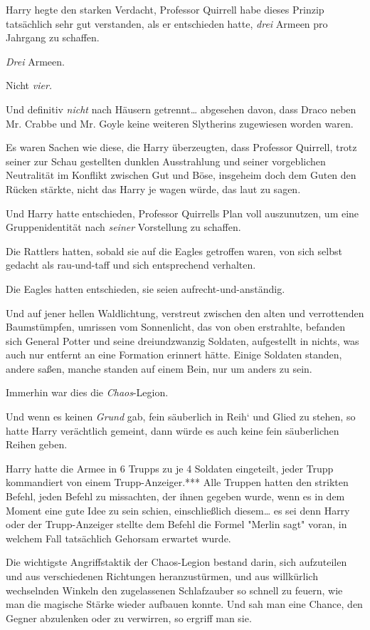 {Harry hegte den starken Verdacht, Professor Quirrell habe dieses Prinzip tatsächlich sehr gut verstanden, als er entschieden hatte, \emph{drei} Armeen pro Jahrgang zu schaffen.

\emph{Drei} Armeen.

Nicht \emph{vier.}

Und definitiv \emph{nicht} nach Häusern getrennt… abgesehen davon, dass Draco neben Mr. Crabbe und Mr. Goyle keine weiteren Slytherins zugewiesen worden waren.

Es waren Sachen wie diese, die Harry überzeugten, dass Professor Quirrell, trotz seiner zur Schau gestellten dunklen Ausstrahlung und seiner vorgeblichen Neutralität im Konflikt zwischen Gut und Böse, insgeheim doch dem Guten den Rücken stärkte, nicht das Harry je wagen würde, das laut zu sagen.

Und Harry hatte entschieden, Professor Quirrells Plan voll auszunutzen, um eine Gruppenidentität nach \emph{seiner} Vorstellung zu schaffen.

Die Rattlers hatten, sobald sie auf die Eagles getroffen waren, von sich selbst gedacht als rau-und-taff und sich entsprechend verhalten.

Die Eagles hatten entschieden, sie seien aufrecht-und-anständig.

Und auf jener hellen Waldlichtung, verstreut zwischen den alten und verrottenden Baumstümpfen, umrissen vom Sonnenlicht, das von oben erstrahlte, befanden sich General Potter und seine dreiundzwanzig Soldaten, aufgestellt in nichts, was auch nur entfernt an eine Formation erinnert hätte. Einige Soldaten standen, andere saßen, manche standen auf einem Bein, nur um anders zu sein.

Immerhin war dies die \emph{Chaos}-Legion.

Und wenn es keinen \emph{Grund} gab, fein säuberlich in Reih` und Glied zu stehen, so hatte Harry verächtlich gemeint, dann würde es auch keine fein säuberlichen Reihen geben.

Harry hatte die Armee in 6 Trupps zu je 4 Soldaten eingeteilt, jeder Trupp kommandiert von einem Trupp-Anzeiger.*** Alle Truppen hatten den strikten Befehl, jeden Befehl zu missachten, der ihnen gegeben wurde, wenn es in dem Moment eine gute Idee zu sein schien, einschließlich diesem… es sei denn Harry oder der Trupp-Anzeiger stellte dem Befehl die Formel "Merlin sagt" voran, in welchem Fall tatsächlich Gehorsam erwartet wurde.

Die wichtigste Angriffstaktik der Chaos-Legion bestand darin, sich aufzuteilen und aus verschiedenen Richtungen heranzustürmen, und aus willkürlich wechselnden Winkeln den zugelassenen Schlafzauber so schnell zu feuern, wie man die magische Stärke wieder aufbauen konnte. Und sah man eine Chance, den Gegner abzulenken oder zu verwirren, so ergriff man sie.

}
